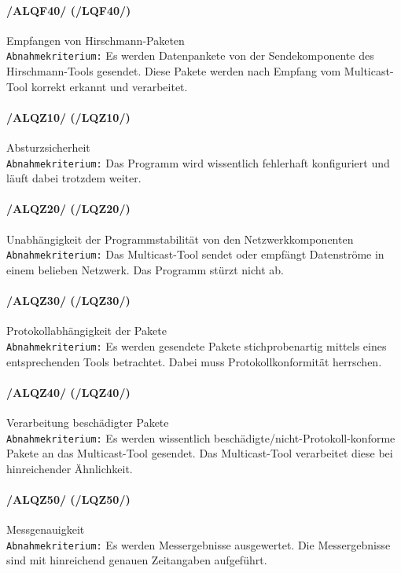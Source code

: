 \paragraph{/ALQF40/ (/LQF40/)} Empfangen von Hirschmann-Paketen\\
\texttt{Abnahmekriterium:} Es werden Datenpankete von der
Sendekomponente des Hirschmann-Tools gesendet. Diese Pakete
werden nach Empfang vom Multicast-Tool korrekt erkannt und
verarbeitet.\\

\paragraph{/ALQZ10/ (/LQZ10/)} Absturzsicherheit\\
\texttt{Abnahmekriterium:} Das Programm wird wissentlich
fehlerhaft konfiguriert und läuft dabei trotzdem weiter.\\

\paragraph{/ALQZ20/ (/LQZ20/)} Unabhängigkeit der Programmstabilität von den
Netzwerkkomponenten\\
\texttt{Abnahmekriterium:} Das Multicast-Tool sendet oder empfängt Datenströme
in einem belieben Netzwerk. Das Programm stürzt nicht ab.\\

\paragraph{/ALQZ30/ (/LQZ30/)} Protokollabhängigkeit der Pakete\\
\texttt{Abnahmekriterium:} Es werden gesendete Pakete
stichprobenartig mittels eines entsprechenden Tools betrachtet.
Dabei muss Protokollkonformität herrschen.\\

\paragraph{/ALQZ40/ (/LQZ40/)} Verarbeitung beschädigter Pakete\\
\texttt{Abnahmekriterium:} Es werden wissentlich
beschädigte/nicht-Protokoll-konforme Pakete an das Multicast-Tool
gesendet. Das Multicast-Tool verarbeitet diese bei hinreichender
Ähnlichkeit.\\

\paragraph{/ALQZ50/ (/LQZ50/)} Messgenauigkeit\\
\texttt{Abnahmekriterium:} Es werden Messergebnisse ausgewertet. Die
Messergebnisse sind mit hinreichend genauen Zeitangaben aufgeführt.\\

